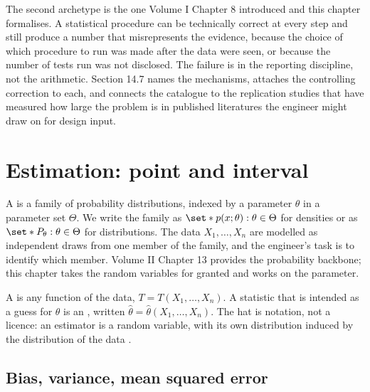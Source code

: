 \begin{archetype}
The second archetype is the one Volume I Chapter 8 introduced and
this chapter formalises. A statistical procedure can be technically
correct at every step and still produce a number that misrepresents
the evidence, because the choice of which procedure to run was made
after the data were seen, or because the number of tests run was not
disclosed. The failure is in the reporting discipline, not the
arithmetic. Section 14.7 names the mechanisms, attaches the
controlling correction to each, and connects the catalogue to the
replication studies that have measured how large the problem is in
published literatures the engineer might draw on for design input.
\end{archetype}

\section{Estimation: point and interval}

A  is a family of probability
distributions, indexed by a parameter $\theta$ in a parameter set
$\Theta$. We write the family as $\set*{p(x; \theta) : \theta \in
\Theta}$ for densities or as $\set*{P_{\theta} : \theta \in
\Theta}$ for distributions. The data $X_{1}, \ldots, X_{n}$ are
modelled as independent draws from one member of the family, and the
engineer's task is to identify which member. Volume II Chapter 13
provides the probability backbone; this chapter takes the random
variables for granted and works on the parameter.

A  is any function of the data, $T = T(X_{1},
\ldots, X_{n})$. A statistic that is intended as a guess for
$\theta$ is an , written $\hat{\theta} =
\hat{\theta}(X_{1}, \ldots, X_{n})$. The hat is notation, not a
licence: an estimator is a random variable, with its own
distribution induced by the distribution of the data
\cite[ch.~6]{text:wasserman2004}.

\subsection{Bias, variance, mean squared error}

